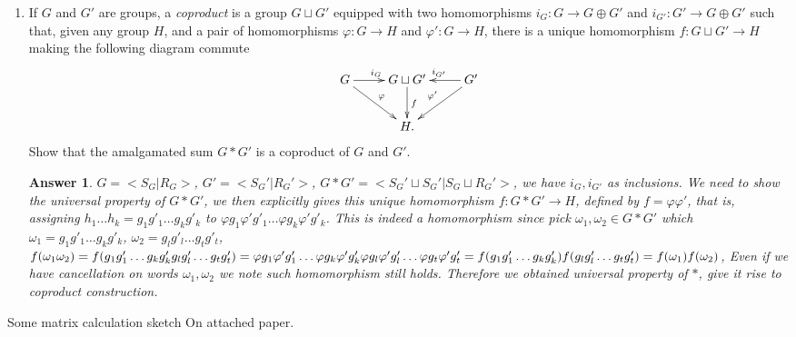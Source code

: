 \documentclass[11pt,leqno]{article}
\newcommand{\<}[1]{{\langle}#1 {\rangle}}
\theoremstyle{plain}
\newtheorem*{answer*}{Answer}
\theoremstyle{definition}
\theoremstyle{remark}
\numberwithin{equation}{section}
\begin{document}
\begin{enumerate}
    \phantom \\
\item If $G$ and $G'$ are groups, a {\em coproduct} is a group $G \sqcup G'$ equipped with two homomorphisms $i_G: G \to G \oplus G'$ and $i_{G'}: G' \to G \oplus G'$ such that, given any group $H$, and a pair of homomorphisms $\varphi: G \to H$ and $\varphi': G \to H$, there is a unique homomorphism $f: G \sqcup G' \to H$ making the following diagram commute
    \[
    \xymatrix{
    G \ar[r]^{i_G}\ar[dr]^{\varphi} & G \sqcup G' \ar[d]^{f}& \ar[l]_{i_{G'}} \ar[dl]_{\varphi'} G' \\
    & H. &
    }
    \]
    Show that the amalgamated sum $G \ast G'$ is a coproduct of $G$ and $G'$.
        \begin{answer*}
        $G=<S_G|R_G>$, $G'=<S_G'|R_G'>$, $G\ast G' = <S_G'\sqcup S_G'|S_G\sqcup R_G'>$, we have $i_{G},i_{G'}$ as inclusions. We need to show the universal property of $G\ast G'$, we then explicitly gives this unique homomorphism $f: G \ast G' \to H$, defined by $f=\varphi \varphi'$, that is, assigning $h_1\dots h_k=g_1g'_1\dots g_kg'_k$ to $\varphi g_1 \varphi' g'_1\dots \varphi g_k\varphi' g'_k$. This is indeed a homomorphism since pick $\omega_1 , \omega_2\in G\ast G'$ which $\omega_1=g_1g'_1\dots g_kg'_{k}$, $\omega_2=g_lg'_l\dots g_tg'_t$,  $f(\omega_1\omega_2)=f(g_1g'_1\dots g_kg'_{k} g_lg'_l\dots g_tg'_t)= \varphi g_1 \varphi' g'_1 \dots \varphi g_k\varphi' g'_k\varphi g_l \varphi' g'_l\dots \varphi g_t\varphi' g'_t =\\f(g_1g'_1\dots g_kg'_{k}) f(g_lg'_l\dots g_tg'_t) = f(\omega_1)f(\omega_2)$,
        Even if we have cancellation on words $\omega_1,\omega_2$ we note such homomorphism still holds. Therefore we obtained universal property of $\ast$, give it rise to coproduct construction.
        \end{answer*}
\end{enumerate}

Some matrix calculation sketch On attached paper.
\end{document}
